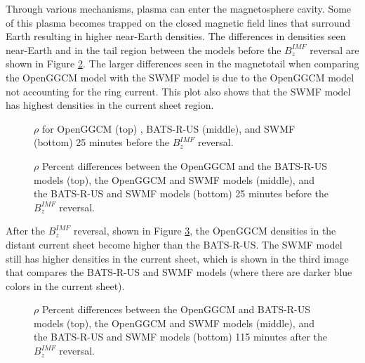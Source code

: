 Through various mechanisms, plasma can enter the magnetosphere cavity. Some of this plasma becomes
trapped on the closed magnetic field lines that surround Earth resulting in higher near-Earth densities.
The differences in densities seen near-Earth and in the tail region
between the models before the $B_z^{IMF}$ reversal are shown in Figure
\ref{fig:rhodiffBeforeFlip}. The larger differences seen in the magnetotail when
comparing the OpenGGCM model with the SWMF model
is due to the OpenGGCM model not accounting for the ring current. This
plot also shows that the SWMF model has highest densities in the current sheet
region.

\begin{figure}
	\centering
	\caption{$\rho$ for OpenGGCM (top) , BATS-R-US (middle), and SWMF (bottom) 25
	minutes before the $B_z^{IMF}$ reversal.}
	\figSpace
	\label{fig:rhoBeforeFlip}
\end{figure}

\begin{figure}
	\centering
	\caption{$\rho$ Percent differences between the OpenGGCM and
	the BATS-R-US models (top), the OpenGGCM and SWMF models (middle), and the
	BATS-R-US and SWMF models (bottom) 25 minutes before the $B_z^{IMF}$ reversal.}
	\figSpace
	\label{fig:rhodiffBeforeFlip}
\end{figure}

After the $B_z^{IMF}$ reversal, shown in Figure \ref{fig:rhodiffAfterFlip}, the
OpenGGCM densities in the distant current sheet become higher than the
BATS-R-US. The SWMF model still has higher densities in the current sheet, which
is shown in the third image that compares the BATS-R-US and SWMF models (where
there are darker blue colors in the current sheet).

\begin{figure}
	\centering
	\caption{$\rho$ Percent differences between the OpenGGCM and
	BATS-R-US models (top), the OpenGGCM and SWMF models (middle), and the
	BATS-R-US and SWMF models (bottom) 115 minutes after the $B_z^{IMF}$ reversal.}
	\figSpace
	\label{fig:rhodiffAfterFlip}
\end{figure}

